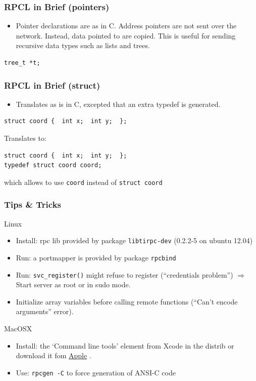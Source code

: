 \documentclass[bigger,hyperref={colorlinks=true, urlcolor=red, plainpages=false, pdfpagelabels, bookmarksnumbered}]{beamer}
\begin{document}
\begin{frame}[fragile]
\frametitle{RPCL in Brief (pointers)}
\label{sec-2-19}

\begin{itemize}
\item Pointer declarations are as in C. Address pointers are not sent over the network. 
     Instead, data pointed to are copied. This is useful for sending recursive data 
     types such as lists and trees.
\end{itemize}

\lstset{language=C}
\begin{lstlisting}
tree_t *t;
\end{lstlisting}
\end{frame}
\begin{frame}[fragile]
\frametitle{RPCL in Brief (struct)}
\label{sec-2-20}

\begin{itemize}
\item Translates as is in C, excepted that an extra typedef is generated.
\end{itemize}

\lstset{language=C}
\begin{lstlisting}
struct coord {  int x;  int y;  };
\end{lstlisting}
Translates to:

\lstset{language=C}
\begin{lstlisting}
struct coord {  int x;  int y;  };
typedef struct coord coord;
\end{lstlisting}
which allows to use \texttt{coord} instead of \texttt{struct coord}
\end{frame}
\begin{frame}
\frametitle{Tips \& Tricks}
\label{sec-2-21}
\begin{block}{Linux}
\label{sec-2-21-1}

\begin{itemize}
\item Install: rpc lib provided by package  \texttt{libtirpc-dev}  (0.2.2-5 on ubuntu 12.04)
\item Run: a portmapper is provided by package \texttt{rpcbind}
\item Run: \texttt{svc\_register()} might refuse to register (``credentials problem'') 
           $\Rightarrow$ Start server as root or in sudo mode.
\item Initialize array variables before calling remote functions 
     (``Can't encode arguments'' error).
\end{itemize}
\end{block}
\begin{block}{MacOSX}
\label{sec-2-21-2}

\begin{itemize}
\item Install: the `Command line tools' element from Xcode in the distrib
              or download it fom  \href{https://developer.apple.com/downloads/}{Apple} .
\item Use: \texttt{rpcgen -C} to force generation of ANSI-C code
\end{itemize}
   
\end{block}
\end{frame}
\end{document}
